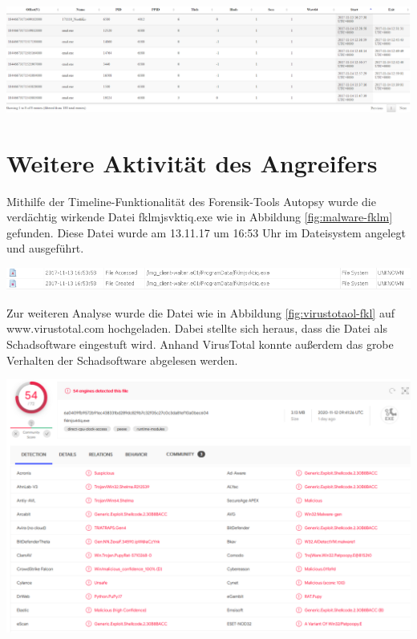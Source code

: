 \begin{center}
	\includegraphics[width=15.8cm]{figures/processlist.png}
	\label{fig:processlist}
\end{center}





\chapter{Weitere Aktivität des Angreifers}
Mithilfe der Timeline-Funktionalität des Forensik-Tools Autopsy wurde die verdächtig wirkende Datei fklmjsvktiq.exe wie in Abbildung \ref{fig:malware-fklm} gefunden. Diese Datei wurde am 13.11.17 um 16:53 Uhr im Dateisystem angelegt und ausgeführt.

\begin{center}
	\includegraphics[width=15.8cm]{figures/malware-fklm.png}
	\label{fig:malware-fklm}
\end{center}

Zur weiteren Analyse wurde die Datei wie in Abbildung \ref{fig:virustotaol-fkl} auf www.virustotal.com hochgeladen.
Dabei stellte sich heraus, dass die Datei als Schadsoftware eingestuft wird. Anhand VirusTotal konnte außerdem das grobe Verhalten der Schadsoftware abgelesen werden.
\begin{center}
	\includegraphics[width=15.8cm]{figures/virustotaol-fklm.PNG}
	\label{fig:virustotaol-fkl}
\end{center}

